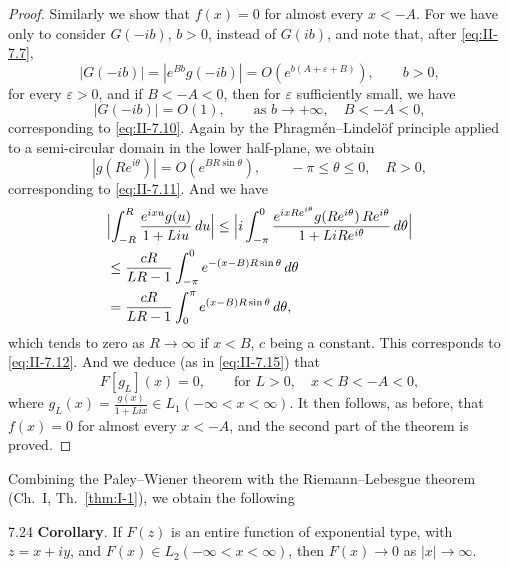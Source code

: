 \begin{proof}
Similarly we show that $f(x)=0$ for almost every $x<-A$. For we have only to consider $G(-ib)$, $b>0$, instead of $G(ib)$, and note that, after \eqref{eq:II-7.7},
\begin{equation}\tag{7.20}\label{eq:II-7.20}
|G(-ib)|=|e^{Bb}g(-ib)|=O(e^{b(A+\varepsilon+B)}),\qquad b>0,
\end{equation}
for every $\varepsilon>0$, and if $B<-A<0$, then for $\varepsilon$ sufficiently small, we have
\begin{equation}\tag{7.21}\label{eq:II-7.21}
|G(-ib)|=O(1),\qquad\text{as }b\to+\infty,\quad B<-A<0,
\end{equation}
corresponding to \eqref{eq:II-7.10}. Again by the Phragm\'en--Lindel\"of principle applied to a semi-circular domain in the lower half-plane, we obtain
\begin{equation}\tag{7.22}\label{eq:II-7.22}
|g(Re^{i\theta})|=O(e^{BR\sin\theta}),\qquad -\pi\le\theta\le 0,\quad R>0,
\end{equation}
corresponding to \eqref{eq:II-7.11}. And we have
\[
\begin{aligned}
&\Bigl|\int_{-R}^{R}\frac{e^{ixu}g(u)}{1+Liu}\,du\Bigr| \le \Bigl|i\int_{-\pi}^{0}\frac{e^{ixRe^{i\theta}}g(Re^{i\theta})\,Re^{i\theta}}{1+LiRe^{i\theta}}\,d\theta\Bigr|\\
&\le \frac{cR}{LR-1}\int_{-\pi}^{0}e^{-(x-B)R\sin\theta}\,d\theta\\
&= \frac{cR}{LR-1}\int_{0}^{\pi}e^{(x-B)R\sin\theta}\,d\theta,
\end{aligned}
\]
which tends to zero as $R\to\infty$ if $x<B$, $c$ being a constant. This corresponds to \eqref{eq:II-7.12}. And we deduce (as in \eqref{eq:II-7.15}) that
\begin{equation}\tag{7.23}\label{eq:II-7.23}
F[g_{L}](x)=0,\qquad\text{for }L>0,\quad x<B<-A<0,
\end{equation}
where $g_{L}(x)=\frac{g(x)}{1+Lix}\in L_{1}(-\infty<x<\infty)$. It then follows, as before, that $f(x)=0$ for almost every $x<-A$, and the second part of the theorem is proved.
\end{proof}

Combining the Paley--Wiener theorem with the Riemann--Lebesgue theorem (Ch.~I, Th.~\ref{thm:I-1}), we obtain the following

\begin{nstmt}{7.24}\label{eq:II-7.24}
\textbf{Corollary}. If $F(z)$ is an entire function of exponential type, with $z=x+iy$, and $F(x)\in L_{2}(-\infty<x<\infty)$, then $F(x)\to 0$ as $|x|\to\infty$.
\end{nstmt}

